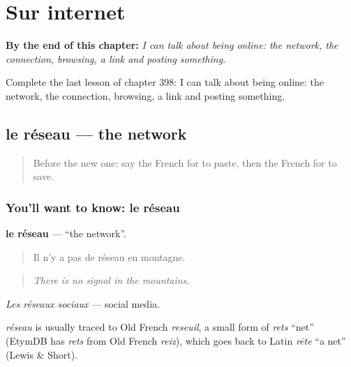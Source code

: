 
\chapter{Sur internet}
\label{ch:fr-sur-internet}

\begin{chapteropening}
\textbf{By the end of this chapter:} \emph{I can talk about being online: the network, the connection, browsing, a link and posting something.}

Complete the last lesson of chapter 398: I can talk about being online: the network, the connection, browsing, a link and posting something.
\end{chapteropening}

\section[le réseau]{le réseau — the network}

\label{lesson:FR-C398-reseau}



\begin{quote}
Before the new one: say the French for to paste, then the French for to save.
\end{quote}

\subsection*{You'll want to know: le réseau}
\textbf{le réseau} — \textquotedblleft{}the network\textquotedblright{}.

\begin{quote}
Il n'y a pas de réseau en montagne.
\end{quote}

\begin{quote}
\emph{There is no signal in the mountains.}
\end{quote}

\emph{Les réseaux sociaux} — social media.

\begin{cousinweb}
\emph{réseau} is usually traced to Old French \emph{reseuil}, a small form of \emph{rets} \textquotedblleft{}net\textquotedblright{} (EtymDB has \emph{rets} from Old French \emph{reiz}), which goes back to Latin \emph{rēte} \textquotedblleft{}a net\textquotedblright{} (Lewis \& Short).
\end{cousinweb}

